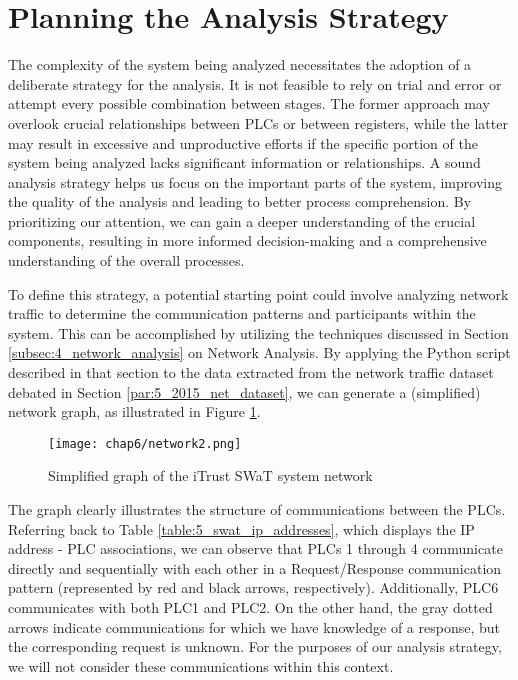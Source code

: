 \section{Planning the Analysis Strategy}
\label{sec:6_analysis_strategy}
The complexity of the system being analyzed necessitates the adoption of a deliberate strategy for the analysis. It is not feasible to rely on trial and error or attempt every possible combination between stages. The former approach may overlook crucial relationships between PLCs or between registers, while the latter may result in excessive and unproductive efforts if the specific portion of the system being analyzed lacks significant information or relationships. 
A sound analysis strategy helps us focus on the important parts of the system, improving the quality of the analysis and leading to better process comprehension. By prioritizing our attention, we can gain a deeper understanding of the crucial components, resulting in more informed decision-making and a comprehensive understanding of the overall processes.

\bigskip
To define this strategy, a potential starting point could involve analyzing network traffic to determine the communication patterns and participants within the system. This can be accomplished by utilizing the techniques discussed in Section \ref{subsec:4_network_analysis} on Network Analysis. By applying the Python script described in that section to the data extracted from the network traffic dataset debated in Section \ref{par:5_2015_net_dataset}, we can generate a (simplified) network graph, as illustrated in Figure \ref{fig:6_network_SWaT}.

\begin{figure}[ht]
	\centering
	\texttt{[image: chap6/network2.png]}
	\caption{Simplified graph of the iTrust SWaT system network}
	\label{fig:6_network_SWaT}
\end{figure}

The graph clearly illustrates the structure of communications between the PLCs. Referring back to Table \ref{table:5_swat_ip_addresses}, which displays the IP address - PLC associations, we can observe that PLCs 1 through 4 communicate directly and sequentially with each other in a Request/Response communication pattern (represented by red and black arrows, respectively). Additionally, PLC6 communicates with both PLC1 and PLC2. On the other hand, the gray dotted arrows indicate communications for which we have knowledge of a response, but the corresponding request is unknown. For the purposes of our analysis strategy, we will not consider these communications within this context.

